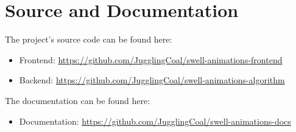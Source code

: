 \section{Source and Documentation} \label{App:AppendixSD}
The project's source code can be found here:
\begin{itemize}
    \item Frontend: \url{https://github.com/JugglingCoal/swell-animations-frontend}
    \item Backend: \url{https://github.com/JugglingCoal/swell-animations-algorithm}
\end{itemize}
The documentation can be found here:
\begin{itemize}
    \item Documentation: \url{https://github.com/JugglingCoal/swell-animations-docs}
\end{itemize}
